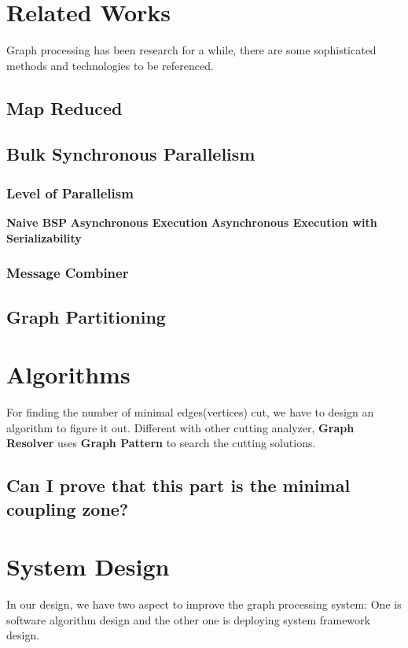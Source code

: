 \documentclass{article}
\begin{document}
	\section{Related Works}
	Graph processing has been research for a while, there are some sophisticated methods and technologies to be referenced. 
	\subsection{Map Reduced}
	\subsection{Bulk Synchronous Parallelism}
	\subsubsection{Level of Parallelism}
	\textbf{Naive BSP}
	\newline
	\textbf{Asynchronous Execution}
	\newline
	\textbf{Asynchronous Execution with Serializability}

	\subsubsection{Message Combiner}
	\subsection{Graph Partitioning}

	\section{Algorithms}
	For finding the number of minimal edges(vertices) cut, we have to design an algorithm to figure it out. Different with other cutting analyzer, \textbf{Graph Resolver} uses \textbf{Graph Pattern}\cite{yan2008mining} to search the cutting solutions.
	\subsection{Can I prove that this part is the minimal coupling zone?}

	\section{System Design}
	In our design, we have two aspect to improve the graph processing system: One is software algorithm design and the other one is deploying system framework design.
\end{document}
